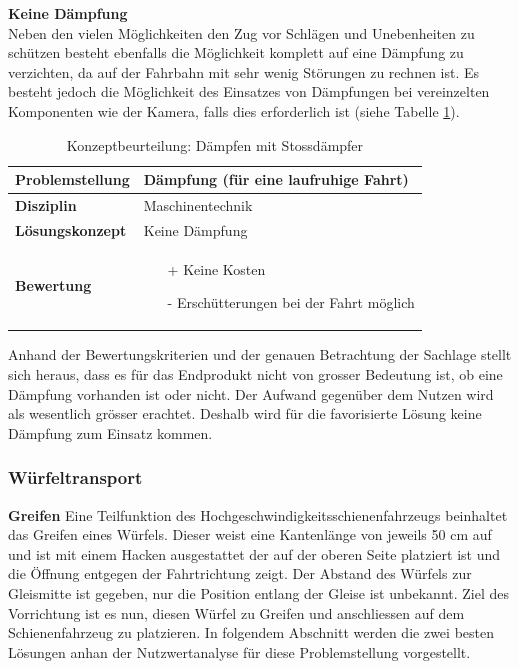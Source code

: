 \documentclass[../../../main.tex]{subfiles}
\begin{document}
\textbf{Keine Dämpfung}\\
Neben den vielen Möglichkeiten den Zug vor Schlägen und Unebenheiten zu schützen besteht ebenfalls die Möglichkeit komplett auf eine Dämpfung zu verzichten, da auf der Fahrbahn mit sehr wenig Störungen zu rechnen ist. Es besteht jedoch die Möglichkeit des Einsatzes von Dämpfungen bei vereinzelten Komponenten wie der Kamera, falls dies erforderlich ist (siehe Tabelle \ref{tab:keinedaempfung}).

\begin{flushleft}
    \begin{table}[h]
    \begin{tabular}{ | l | p{11cm} |}
    \hline
    \textbf{Problemstellung} & Dämpfung (für eine laufruhige Fahrt) \\ \hline
    \textbf{Disziplin} & Maschinentechnik \\ \hline
    \textbf{Lösungskonzept} & Keine Dämpfung \\ \hline
    \textbf{Bewertung} &  \begin{itemize}
                            \item[+] Keine Kosten
                            \item[-] Erschütterungen bei der Fahrt möglich
                          \end{itemize} \\ \hline
    \end{tabular}
    \caption{Konzeptbeurteilung: Dämpfen mit Stossdämpfer}
    \label{tab:keinedaempfung}
\end{table}
\end{flushleft}

Anhand der Bewertungskriterien und der genauen Betrachtung der Sachlage stellt sich heraus, dass es für das Endprodukt nicht von grosser Bedeutung ist, ob eine Dämpfung vorhanden ist oder nicht. Der Aufwand gegenüber dem Nutzen wird als wesentlich grösser erachtet. Deshalb wird für die favorisierte Lösung keine Dämpfung zum Einsatz kommen.

\subsubsection{Würfeltransport}

\textbf{Greifen}
 Eine Teilfunktion des Hochgeschwindigkeitsschienenfahrzeugs beinhaltet das Greifen eines Würfels. Dieser weist eine Kantenlänge von jeweils 50 cm auf und ist mit einem Hacken ausgestattet der auf der oberen Seite platziert ist und die Öffnung entgegen der Fahrtrichtung zeigt. Der Abstand des Würfels zur Gleismitte ist gegeben, nur die Position entlang der Gleise ist unbekannt. Ziel des Vorrichtung ist es nun, diesen Würfel zu Greifen und anschliessen auf dem Schienenfahrzeug zu platzieren. In folgendem Abschnitt werden die zwei besten Lösungen anhan der Nutzwertanalyse für diese Problemstellung vorgestellt.
\end{document}
